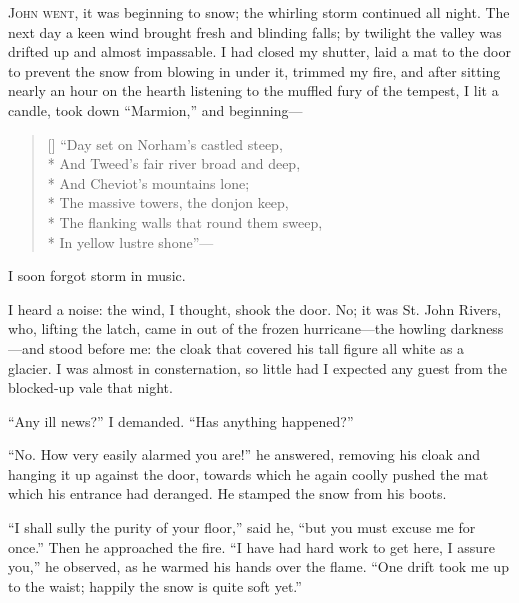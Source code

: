 
 \textsc{\Mr{} \St{} John went,} it was beginning to snow; the whirling storm
continued all night. The next day a keen wind brought fresh and
blinding falls; by twilight the valley was drifted up and almost
impassable. I had closed my shutter, laid a mat to the door to prevent
the snow from blowing in under it, trimmed my fire, and after sitting
nearly an hour on the hearth listening to the muffled fury of the
tempest, I lit a candle, took down \enquote{Marmion,} and beginning---

\begin{verse}[\versewidth]
	\enquote{Day set on Norham's castled steep,\\*
		And Tweed's fair river broad and deep,\\*
		\hspace*{0.333em}\hspace*{0.333em} And Cheviot's mountains lone;\\*
		The massive towers, the donjon keep,\\*
		The flanking walls that round them sweep,\\*
		\hspace*{0.333em}\hspace*{0.333em} In yellow lustre shone}---
\end{verse}

I soon forgot storm in music.

I heard a noise: the wind, I thought, shook the door. No; it was St.
John Rivers, who, lifting the latch, came in out of the frozen
hurricane---the howling darkness---and stood before me: the cloak that
covered his tall figure all white as a glacier. I was almost in
consternation, so little had I expected any guest from the blocked-up
vale that night.

\enquote{Any ill news?} I demanded. \enquote{Has anything happened?}

\enquote{No. How very easily alarmed you are!} he answered, removing
his cloak and hanging it up against the door, towards which he again
coolly pushed the mat which his entrance had deranged. He stamped the
snow from his boots.

\enquote{I shall sully the purity of your floor,} said he, \enquote{but
	you must excuse me for once.} Then he approached the fire. \enquote{I
	have had hard work to get here, I assure you,} he observed, as he warmed
his hands over the flame. \enquote{One drift took me up to the waist;
	happily the snow is quite soft yet.}

